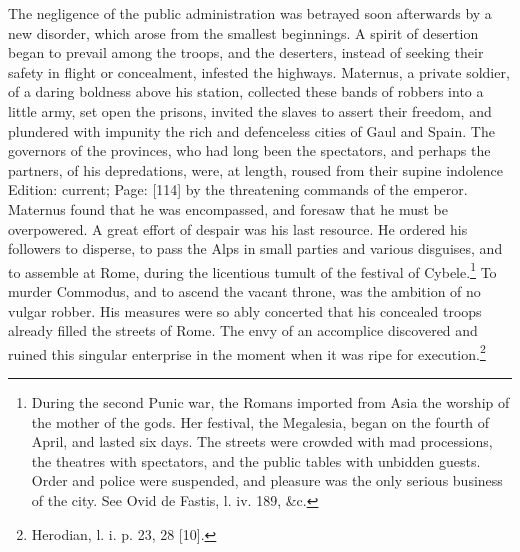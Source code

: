 The negligence of the public administration was betrayed soon afterwards by a new disorder, which arose from the smallest beginnings. A spirit of desertion began to prevail among the troops, and the deserters, instead of seeking their safety in flight or concealment, infested the highways. Maternus, a private soldier, of a daring boldness above his station, collected these bands of robbers into a little army, set open the prisons, invited the slaves to assert their freedom, and plundered with impunity the rich and defenceless cities of Gaul and Spain. The governors of the provinces, who had long been the spectators, and perhaps the partners, of his depredations, were, at length, roused from their supine indolence Edition: current; Page: [114] by the threatening commands of the emperor. Maternus found that he was encompassed, and foresaw that he must be overpowered. A great effort of despair was his last resource. He ordered his followers to disperse, to pass the Alps in small parties and various disguises, and to assemble at Rome, during the licentious tumult of the festival of Cybele.\footnote{During the second Punic war, the Romans imported from Asia the worship of the mother of the gods. Her festival, the Megalesia, began on the fourth of April, and lasted six days. The streets were crowded with mad processions, the theatres with spectators, and the public tables with unbidden guests. Order and police were suspended, and pleasure was the only serious business of the city. See Ovid de Fastis, l. iv. 189, \&c.} To murder Commodus, and to ascend the vacant throne, was the ambition of no vulgar robber. His measures were so ably concerted that his concealed troops already filled the streets of Rome. The envy of an accomplice discovered and ruined this singular enterprise in the moment when it was ripe for execution.\footnote{Herodian, l. i. p. 23, 28 [10].}


